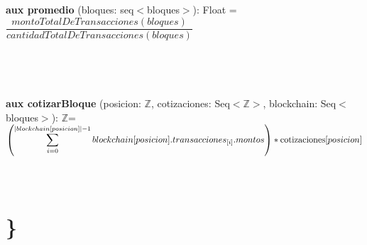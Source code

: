 \documentclass{article}
\newcommand{\Entero}{$\mathds{Z}$}
\begin{document}
    \textbf{aux promedio} (bloques: seq$<$bloques$>$): Float = \\

    \indent\indent$\dfrac{montoTotalDeTransacciones(bloques)}{cantidadTotalDeTransacciones(bloques)}$\\\\\\\\\\

    \textbf{aux cotizarBloque} (posicion: \Entero, cotizaciones: Seq$<$\Entero$>$, blockchain: Seq$<$bloques$>$): \Entero =\\

        \indent\indent $\left( \mathlarger{\sum\limits_{i=0}^{|blockchain[posicion]|-1} blockchain[posicion].transacciones_{[i]}.montos} \right) * \text{cotizaciones}[posicion]$\\\\\\

\section*{\}}
\end{document}
